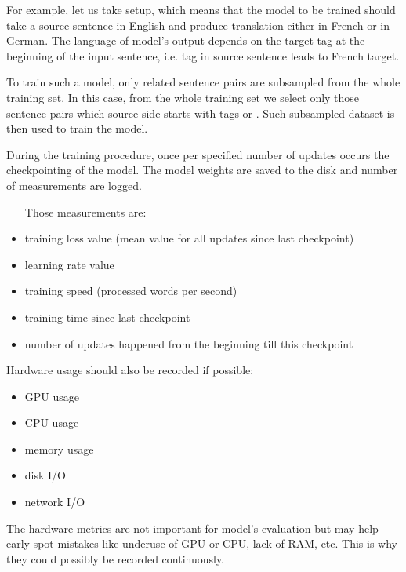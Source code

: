 For example, let us take  setup, which means that
the model to be trained should take a source sentence in English and
produce translation either in French or in German.
The language of model's output depends on the target tag at the beginning
of the input sentence, i.e.  tag in source sentence leads to French
target.

To train such a model, only related sentence pairs are subsampled
from the whole training set.
In this case, from the whole training set we select only those sentence
pairs which source side starts with tags  or .
Such subsampled dataset is then used to train the model.

During the training procedure, once per specified number of updates
occurs the checkpointing of the model.
The model weights are saved to the disk and number of measurements are logged.

\begin{samepage}
\begin{itemize}
	\item [Those measurements are:]
	\item training loss value (mean value for all updates since
	last checkpoint)
	\item learning rate value
	\item training speed (processed words per second)
	\item training time since last checkpoint
	\item number of updates happened from the beginning till this checkpoint
\end{itemize}
\end{samepage}
\begin{samepage}
Hardware usage should also be recorded if possible:
\begin{itemize}
	\item GPU usage
	\item CPU usage
	\item memory usage
	\item disk I/O
	\item network I/O
\end{itemize}
\end{samepage}

The hardware metrics are not important for model's evaluation
but may help early spot mistakes like underuse of GPU or CPU, lack of RAM, etc.
This is why they could possibly be recorded continuously. 

